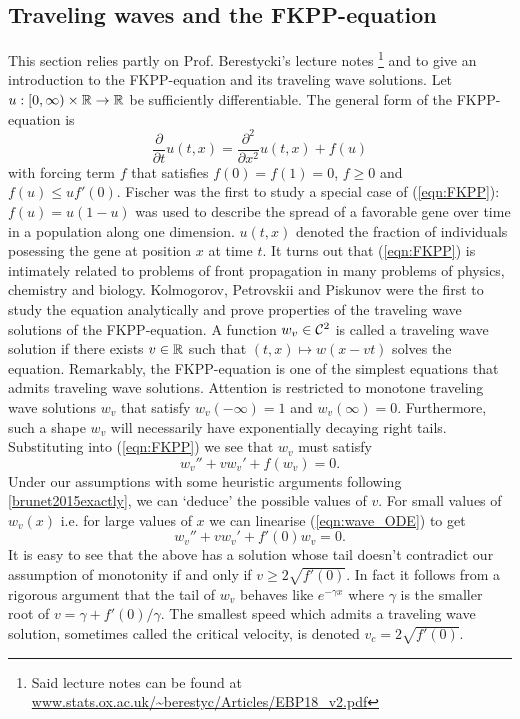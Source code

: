 \subsection{Traveling waves and the FKPP-equation}\label{subsec:FKPP}
This section relies partly on Prof. Berestycki's lecture notes \footnote{Said lecture notes can be found at \url{www.stats.ox.ac.uk/~berestyc/Articles/EBP18_v2.pdf}} and \cite{brunet2015exactly} to give an introduction to the FKPP-equation and its traveling wave solutions. Let $u:[0, \infty) \times \R \to \R$ be sufficiently differentiable. The general form of the FKPP-equation is 
\begin{equation}\label{eqn:FKPP}
\frac{\partial}{\partial t} u(t, x) = \frac{\partial^2}{\partial x^2} u(t, x) + f(u)
\end{equation}
with forcing term $f$ that satisfies $f(0)=f(1)=0$, $f \geq 0$ and $f(u) \leq u f'(0)$. Fischer \cite{fisher1937wave} was the first to study a special case of (\ref{eqn:FKPP}): $f(u) = u (1 - u)$ was used to describe the spread of a favorable gene over time in a population along one dimension. $u(t, x)$ denoted the fraction of individuals posessing the gene at position $x$ at time $t$. It turns out that (\ref{eqn:FKPP}) is intimately related to problems of front propagation in many problems of physics, chemistry and biology. Kolmogorov, Petrovskii and Piskunov \cite{FKPP_origin} were the first to study the equation analytically and prove properties of the traveling wave solutions of the FKPP-equation. A function $w_v \in \cal{C}^2$ is called a traveling wave solution if there exists $v \in \R$ such that $(t,x) \mapsto w(x - v t)$ solves the equation. Remarkably, the FKPP-equation is one of the simplest equations that admits traveling wave solutions. Attention is restricted to monotone traveling wave solutions $w_v$ that satisfy $w_v(-\infty) = 1$ and $w_v(\infty) = 0$. Furthermore, such a shape $w_v$ will necessarily have exponentially decaying right tails. Substituting into (\ref{eqn:FKPP}) we see that $w_v$ must satisfy
\begin{equation}\label{eqn:wave_ODE}
w_v'' + v w_v' + f(w_v) = 0. 
\end{equation}
Under our assumptions with some heuristic arguments following \ref{brunet2015exactly}, we can `deduce' the possible values of $v$. For small values of $w_v(x)$ i.e. for large values of $x$ we can linearise (\ref{eqn:wave_ODE}) to get
\begin{equation}\nonumber
w_v'' + v w_v' + f'(0) w_v = 0. 
\end{equation}
It is easy to see that the above has a solution whose tail doesn't contradict our assumption of monotonity if and only if $v \geq 2 \sqrt{f'(0)}$. In fact it follows from a rigorous argument that the tail of $w_v$ behaves like $e^{- \gamma x}$ where $\gamma$ is the smaller root of $v = \gamma + f'(0) / \gamma$. The smallest speed which admits a traveling wave solution, sometimes called the critical velocity, is denoted $v_c = 2 \sqrt{f'(0)}$. \\


